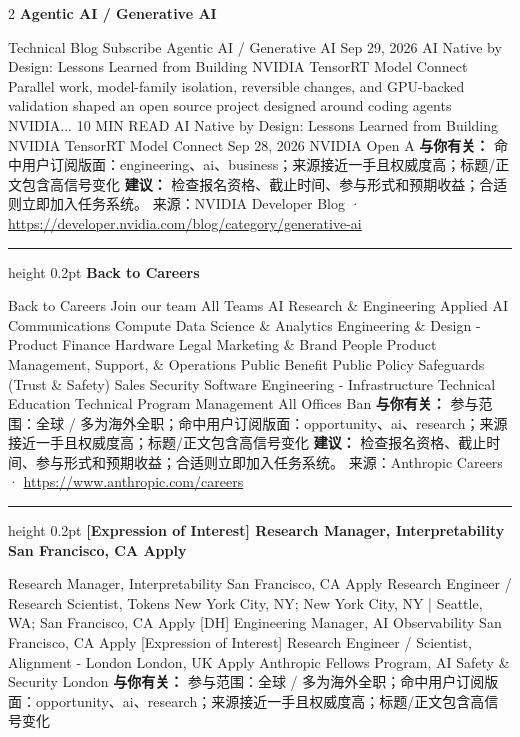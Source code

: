 \documentclass[10.5pt]{ctexart}
\begin{document}
\begin{multicols}{2}
{\large\bfseries Agentic AI / Generative AI}\par
Technical Blog Subscribe Agentic AI / Generative AI Sep 29, 2026 AI Native by Design: Lessons Learned from Building NVIDIA TensorRT Model Connect Parallel work, model-family isolation, reversible changes, and GPU-backed validation shaped an open source project designed around coding agents NVIDIA... 10 MIN READ AI Native by Design: Lessons Learned from Building NVIDIA TensorRT Model Connect Sep 28, 2026 NVIDIA Open A
\textbf{与你有关：} 命中用户订阅版面：engineering、ai、business；来源接近一手且权威度高；标题/正文包含高信号变化
\textbf{建议：} 检查报名资格、截止时间、参与形式和预期收益；合适则立即加入任务系统。
{\footnotesize\color{ormuted} 来源：NVIDIA Developer Blog · \url{https://developer.nvidia.com/blog/category/generative-ai}}
\vspace{2mm}
\hrule height 0.2pt
\vspace{2mm}
{\large\bfseries Back to Careers}\par
Back to Careers Join our team All Teams AI Research \& Engineering Applied AI Communications Compute Data Science \& Analytics Engineering \& Design - Product Finance Hardware Legal Marketing \& Brand People Product Management, Support, \& Operations Public Benefit Public Policy Safeguards (Trust \& Safety) Sales Security Software Engineering - Infrastructure Technical Education Technical Program Management All Offices Ban
\textbf{与你有关：} 参与范围：全球 / 多为海外全职；命中用户订阅版面：opportunity、ai、research；来源接近一手且权威度高；标题/正文包含高信号变化
\textbf{建议：} 检查报名资格、截止时间、参与形式和预期收益；合适则立即加入任务系统。
{\footnotesize\color{ormuted} 来源：Anthropic Careers · \url{https://www.anthropic.com/careers}}
\vspace{2mm}
\hrule height 0.2pt
\vspace{2mm}
{\large\bfseries [Expression of Interest] Research Manager, Interpretability San Francisco, CA Apply}\par
[Expression of Interest] Research Manager, Interpretability San Francisco, CA Apply Research Engineer / Research Scientist, Tokens New York City, NY; New York City, NY | Seattle, WA; San Francisco, CA Apply [DH] Engineering Manager, AI Observability San Francisco, CA Apply [Expression of Interest] Research Engineer / Scientist, Alignment - London London, UK Apply Anthropic Fellows Program, AI Safety \& Security London
\textbf{与你有关：} 参与范围：全球 / 多为海外全职；命中用户订阅版面：opportunity、ai、research；来源接近一手且权威度高；标题/正文包含高信号变化

\end{multicols}
\end{document}
